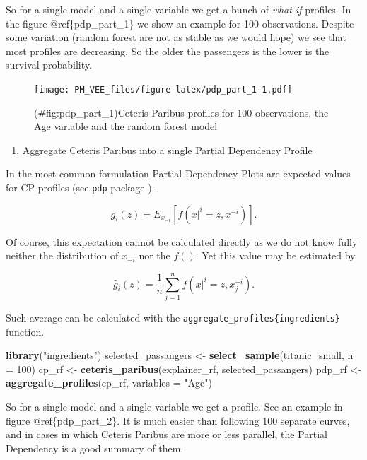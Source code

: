 \documentclass[]{krantz}
\newenvironment{Shaded}{\begin{snugshade}}{\end{snugshade}}
\newcommand{\DataTypeTok}[1]{\textcolor[rgb]{0.13,0.29,0.53}{#1}}
\newcommand{\DecValTok}[1]{\textcolor[rgb]{0.00,0.00,0.81}{#1}}
\newcommand{\KeywordTok}[1]{\textcolor[rgb]{0.13,0.29,0.53}{\textbf{#1}}}
\newcommand{\NormalTok}[1]{#1}
\newcommand{\StringTok}[1]{\textcolor[rgb]{0.31,0.60,0.02}{#1}}
\providecommand{\tightlist}{%
  \setlength{\itemsep}{0pt}\setlength{\parskip}{0pt}}
\theoremstyle{definition}
\theoremstyle{definition}
\theoremstyle{definition}
\theoremstyle{remark}
\begin{document}
So for a single model and a single variable we get a bunch of
\emph{what-if} profiles. In the figure @ref\{pdp\_part\_1\} we show an
example for 100 observations. Despite some variation (random forest are
not as stable as we would hope) we see that most profiles are
decreasing. So the older the passengers is the lower is the survival
probability.

\begin{figure}
\centering
\texttt{[image: PM\_VEE\_files/figure-latex/pdp\_part\_1-1.pdf]}
\caption{(\#fig:pdp\_part\_1)Ceteris Paribus profiles for 100
observations, the Age variable and the random forest model}
\end{figure}

\begin{enumerate}
\def\labelenumi{\arabic{enumi}.}
\setcounter{enumi}{1}
\tightlist
\item
  Aggregate Ceteris Paribus into a single Partial Dependency Profile
\end{enumerate}

In the most common formulation Partial Dependency Plots are expected
values for CP profiles (see \texttt{pdp} package \citep{pdp}).

\[
g_i(z) = E_{x_{-i}}[ f(x|^i = z, x^{-i}) ].
\]

Of course, this expectation cannot be calculated directly as we do not
know fully neither the distribution of \(x_{-i}\) nor the \(f()\). Yet
this value may be estimated by

\[
\hat g_i(z) = \frac{1}{n} \sum_{j=1}^{n} f(x|^i = z, x_j^{-i}).
\]

Such average can be calculated with the
\texttt{aggregate\_profiles\{ingredients\}} function.

\begin{Shaded}
\begin{Highlighting}[]
\KeywordTok{library}\NormalTok{(}\StringTok{"ingredients"}\NormalTok{)}
\NormalTok{selected_passangers <-}\StringTok{ }\KeywordTok{select_sample}\NormalTok{(titanic_small, }\DataTypeTok{n =} \DecValTok{100}\NormalTok{)}
\NormalTok{cp_rf <-}\StringTok{ }\KeywordTok{ceteris_paribus}\NormalTok{(explainer_rf, selected_passangers)}
\NormalTok{pdp_rf <-}\StringTok{ }\KeywordTok{aggregate_profiles}\NormalTok{(cp_rf, }\DataTypeTok{variables =} \StringTok{"Age"}\NormalTok{)}
\end{Highlighting}
\end{Shaded}

So for a single model and a single variable we get a profile. See an
example in figure @ref\{pdp\_part\_2\}. It is much easier than following
100 separate curves, and in cases in which Ceteris Paribus are more or
less parallel, the Partial Dependency is a good summary of them.
\end{document}
